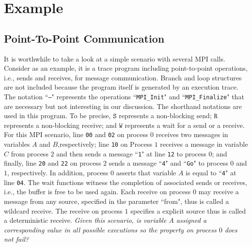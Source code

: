\section{Example}\label{sec:example}
\subsection{Point-To-Point Communication}
It is worthwhile to take a look at a simple scenario with several MPI calls. Consider  as an example, it is a trace program including point-to-point operations, i.e., sends and receives, for message communication. Branch and loop structures are not included because the program itself is generated by an execution trace. The notation ``\texttt{---}" represents the operations ``\texttt{MPI\_Init}" and ``\texttt{MPI\_Finalize}" that are necessary but not interesting in our discussion. The shorthand notations are used in this program. To be precise, $\mathtt{S}$ represents a non-blocking send; $\mathtt{R}$ represents a non-blocking receive; and $\mathtt{W}$ represents a wait for a send or a receive. For this MPI scenario, line \texttt{00} and \texttt{02} on process $0$ receives two messages in variables $A$ and $B$,respectively; line \texttt{10} on Process $1$ receives a message in variable $C$ from process $2$ and then sends a message ``\texttt{1}" at line \texttt{12} to process $0$; and finally, line \texttt{20} and \texttt{22} on process $2$ sends a message ``\texttt{4}" and ``\texttt{Go}" to process $0$ and $1$, respectively. In addition, process $0$ asserts that variable $A$ is equal to ``\texttt{4}" at line \texttt{04}. The wait functions witness the completion of associated sends or receives, i.e., the buffer is free to be used again. Each receive on process $0$ may receive a message from any source, specified in the parameter ``from", thus is called a wildcard receive. The receive on process $1$ specifies a explicit source thus is called a deterministic receive. \textit{Given this scenario, is variable $A$ assigned a corresponding value in all possible executions so the property on process $0$ does not fail?}

